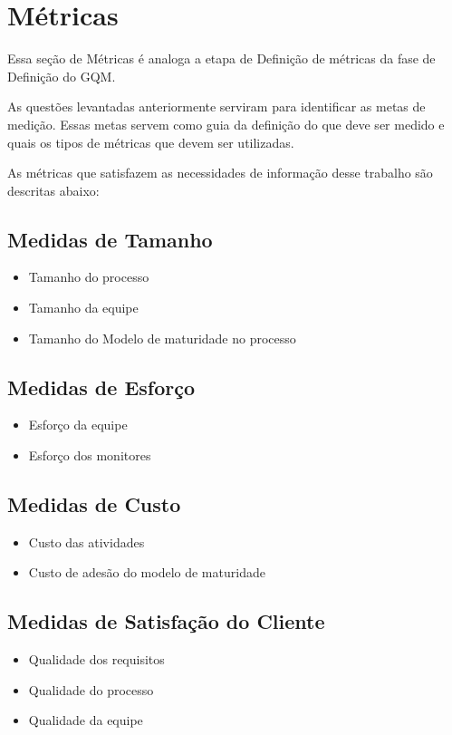 \chapter{Métricas}

Essa seção de Métricas é analoga a etapa de Definição de métricas da fase de Definição do GQM.

As questões levantadas anteriormente serviram para identificar as metas de medição. Essas metas servem como guia da definição do que deve ser medido e quais os tipos de métricas que devem ser utilizadas.

As métricas que satisfazem as necessidades de informação desse trabalho são descritas abaixo:




\section{Medidas de Tamanho}
	\begin{itemize}  
	\item Tamanho do processo
	\item Tamanho da equipe
	\item Tamanho do Modelo de maturidade no processo
	\end{itemize}

\section{Medidas de Esforço}
	\begin{itemize}  
	\item Esforço da equipe
	\item Esforço dos monitores
	\end{itemize}

\section{Medidas de Custo}
	\begin{itemize}  
	\item Custo das atividades
	\item Custo de adesão do modelo de maturidade
	\end{itemize}

\section{Medidas de Satisfação do Cliente}
	\begin{itemize}  
	\item Qualidade dos requisitos
	\item Qualidade do processo
	\item Qualidade da equipe
	\end{itemize}

